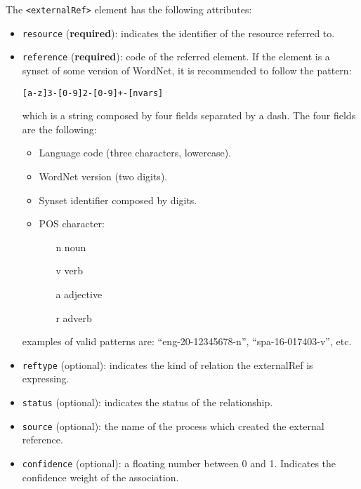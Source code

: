 The \texttt{<externalRef>} element has the following attributes:
\begin{itemize}
\item \texttt{resource} (\textbf{required}): indicates the identifier of the
  resource referred to.
\item \texttt{reference} (\textbf{required}): code of the referred
  element. If the element is a synset of some version of WordNet, it is
  recommended to follow the pattern:\\
  \begin{center}
    \texttt{[a-z]{3}-[0-9]{2}-[0-9]+-[nvars]}
  \end{center}
  which is a string composed by four fields separated by a dash. The four
  fields are the following:
  \begin{itemize}
  \item Language code (three characters, lowercase).
  \item WordNet version (two digits).
  \item Synset identifier composed by digits.
  \item POS character:
    \begin{itemize}
    \item [n] noun
    \item [v] verb
    \item [a] adjective
    \item [r] adverb
    \end{itemize}
  \end{itemize}
  examples of valid patterns are: ``eng-20-12345678-n'',
  ``spa-16-017403-v'', etc.
\item \texttt{reftype} (optional): indicates the kind of relation the
  externalRef is expressing.
\item \texttt{status} (optional): indicates the status of the relationship.
\item \texttt{source} (optional): the name of the process which created the
  external reference.
\item \texttt{confidence} (optional): a floating number between 0 and
  1. Indicates the confidence weight of the association.
\end{itemize}

